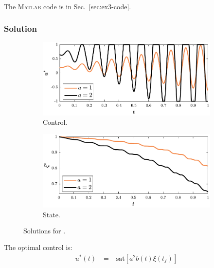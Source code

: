 \noindent The \textsc{Matlab} code is in Sec.~\ref{sec:ex3-code}.

\subsubsection{Solution}

\begin{figure}
\centering

\begin{subfigure}{0.5\textwidth}
\centering
\includegraphics[width=\textwidth]{../ch5/figures/ex3sol-controls}%
\caption{Control.}
\label{fig:ch5:ex3sol:controls}
\end{subfigure}%
\begin{subfigure}{0.5\textwidth}
\centering
\includegraphics[width=\textwidth]{../ch5/figures/ex3sol-states}%
\caption{State.}
\label{fig:ch5:ex3sol:states}
\end{subfigure}%

\caption{Solutions for .}
\label{fig:ch5:ex3sol}
\end{figure}

The optimal control is:
\begin{align}
u^*(t) &= - \mathrm{sat}\left[ a^2 b(t) \xi(t_f) \right]
\end{align}

